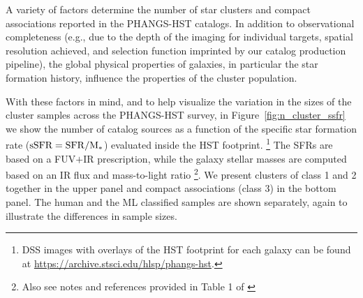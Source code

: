 \documentclass[linenumbers]{aastex63}
\begin{document}
A variety of factors determine the number of star clusters and compact associations reported in the PHANGS-HST catalogs.
In addition to observational completeness (e.g., due to the depth of the imaging for individual targets, spatial resolution achieved, and selection function imprinted by our catalog production pipeline), the global physical properties of galaxies, in particular the star formation history, influence the properties of the cluster population. 


With these factors in mind, and to help visualize the variation in the sizes of the cluster samples across the PHANGS-HST survey, in Figure~\ref{fig:n_cluster_ssfr} we show the number of catalog sources as a function of the specific star formation rate (${\rm sSFR = SFR / M_{*}}$) evaluated inside the HST footprint. \footnote{DSS images with overlays of the HST footprint for each galaxy can be found at \url{https://archive.stsci.edu/hlsp/phangs-hst}.}  
The SFRs are based on a FUV$+$IR prescription, while the galaxy stellar masses are computed based on an IR flux and mass-to-light ratio \citep{leroy_z_2019,leroy_phangs-alma_2021}\footnote{Also see notes and references provided in Table 1 of \citet{lee_phangs-hst_2022}}.  We present clusters of class 1 and 2 together in the upper panel and compact associations (class 3) in the bottom panel.  
The human and the ML classified samples are shown separately, again to illustrate the differences in sample sizes. 
\end{document}
